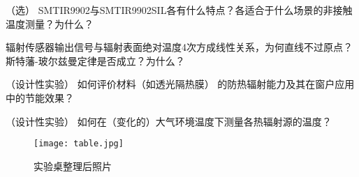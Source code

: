 \documentclass[dvipsnames, svgnames,a4paper,11pt]{article}
\begin{document}
\begin{question}
	（选） SMTIR9902与SMTIR9902SIL各有什么特点？各适合于什么场景的非接触温度测量？为什么？
\end{question}



\begin{question}
	辐射传感器输出信号与辐射表面绝对温度4次方成线性关系，为何直线不过原点？斯特藩-玻尔兹曼定律是否成立？为什么？
\end{question}





\begin{question}
	（设计性实验） 如何评价材料（如透光隔热膜） 的防热辐射能力及其在窗户应用中的节能效果？
\end{question}









\begin{question}
	（设计性实验） 如何在（变化的）大气环境温度下测量各热辐射源的温度？
\end{question}







\begin{figure}[htbp]
	\centering
	\texttt{[image: table.jpg]}
	\caption{实验桌整理后照片}
\end{figure}
	
\end{document}
